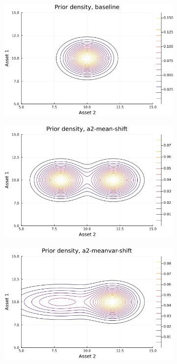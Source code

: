 \documentclass{article}
\begin{document}
\begin{figure}
    \centering
    \begin{subfigure}{0.4\textwidth}
        \includegraphics[width=\textwidth]{../plots/economy/baseline/prior.png}
        \end{subfigure}
    \begin{subfigure}{0.4\textwidth}
        \includegraphics[width=\textwidth]{../plots/economy/a2-mean-shift/prior.png}
    \end{subfigure}
    \begin{subfigure}{0.4\textwidth}
        \includegraphics[width=\textwidth]{../plots/economy/a2-meanvar-shift/prior.png}

\end{subfigure}
\end{figure}
\end{document}

